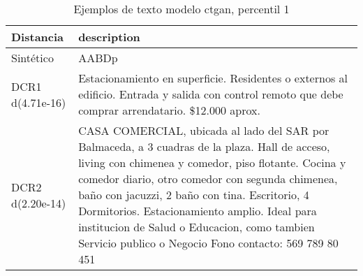 \begin{table}[H]
\centering
\fontsize{10}{14}\selectfont
\caption{Ejemplos de texto modelo ctgan, percentil 1}
\label{table-example-economicos-b-2-ctgan-1p-text}
\begin{tabular}{|l|m{35em}|}
\hline
\rowcolor[gray]{0.8}
Distancia & description \\
\hline Sintético & AABDp \\
\hline DCR1 d(4.71e-16) & Estacionamiento en superficie. Residentes o externos al edificio. Entrada y salida con control remoto que debe comprar arrendatario. \$12.000 aprox. \\
\hline DCR2 d(2.20e-14) &  CASA COMERCIAL, ubicada  al lado del SAR por Balmaceda, a 3 cuadras de la plaza. Hall de acceso, living con chimenea y comedor, piso flotante. Cocina y comedor diario, otro comedor con segunda chimenea, ba\~no con jacuzzi, 2 ba\~no con tina. Escritorio, 4 Dormitorios. Estacionamiento amplio. 
Ideal para institucion de Salud o Educacion, como tambien Servicio publico o Negocio 
Fono contacto: 569 789 80 451 \\
\hline
\end{tabular}
\end{table}
